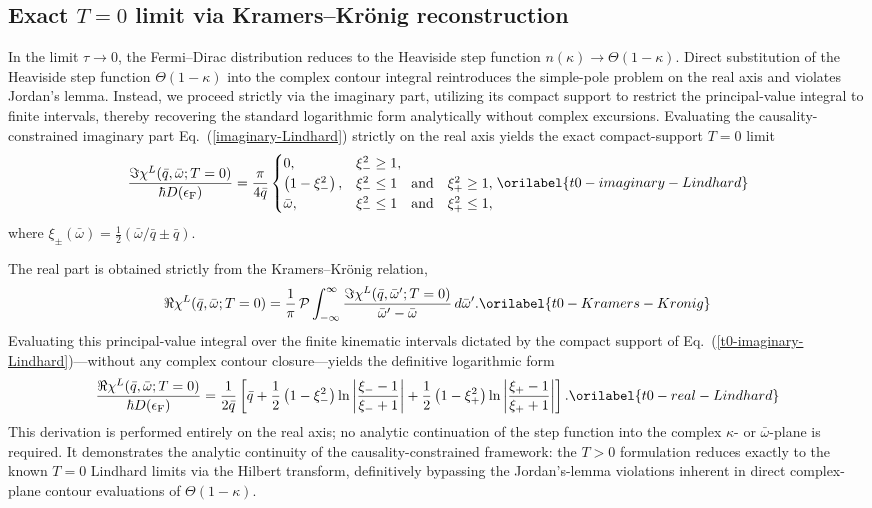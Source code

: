 \documentclass[aps,showkeys,noshowpacs,superscriptaddress,pre,preprint]{revtex4-2}
\let\label\orilabel
\begin{document}
\subsection{Exact $T=0$ limit via Kramers--Kr\"onig reconstruction}
\label{sec:t0-kk-reconstruction}

In the limit $\tau\to 0$, the Fermi--Dirac distribution reduces to the Heaviside step function $n(\kappa)\to\Theta(1-\kappa)$.
Direct substitution of the Heaviside step function $\Theta(1-\kappa)$ into the complex contour integral reintroduces the simple-pole problem on the real axis and violates Jordan's lemma.
Instead, we proceed strictly via the imaginary part, utilizing its compact support to restrict the principal-value integral to finite intervals, thereby recovering the standard logarithmic form analytically without complex excursions.
Evaluating the causality-constrained imaginary part Eq.~(\ref{imaginary-Lindhard}) strictly on the real axis yields the exact compact-support $T=0$ limit~\cite{Lindhard1954}
\begin{equation}
\frac{\Im \chi^L(\bar{q},\bar{\omega};T=0)}{\hbar D(\epsilon_\mathrm{F})} = \frac{\pi}{4\bar{q}}
\begin{cases}
0 , & \xi_-^2 \ge 1 , \\
\left( 1 - \xi_-^2 \right) , & \xi_-^2 \le 1 \quad \mathrm{and} \quad \xi_+^2 \ge 1 , \\
\bar{\omega} , & \xi_-^2 \le 1 \quad \mathrm{and} \quad \xi_+^2 \le 1 ,
\end{cases}
\label{t0-imaginary-Lindhard}
\end{equation}
where $\xi_\pm(\bar{\omega}) = \frac{1}{2}\left(\bar{\omega}/\bar{q} \pm \bar{q}\right)$.

The real part is obtained strictly from the Kramers--Kr\"onig relation,
\begin{equation}
\Re \chi^L(\bar{q},\bar{\omega};T=0) = \frac{1}{\pi}\,\mathcal{P}\int_{-\infty}^{\infty}\frac{\Im \chi^L(\bar{q},\bar{\omega}';T=0)}{\bar{\omega}'-\bar{\omega}}\,d\bar{\omega}' .
\label{t0-Kramers-Kronig}
\end{equation}
Evaluating this principal-value integral over the finite kinematic intervals dictated by the compact support of Eq.~(\ref{t0-imaginary-Lindhard})---without any complex contour closure---yields the definitive logarithmic form
\begin{equation}
\frac{\Re \chi^L(\bar{q},\bar{\omega};T=0)}{\hbar D(\epsilon_\mathrm{F})} = \frac{1}{2\bar{q}} \left[ \bar{q}
+ \frac{1}{2} \left( 1 - \xi_-^2 \right) \ln\left\vert \frac{\xi_- - 1}{\xi_- + 1} \right\vert
+ \frac{1}{2} \left( 1 - \xi_+^2 \right) \ln\left\vert \frac{\xi_+ - 1}{\xi_+ + 1} \right\vert
\right] .
\label{t0-real-Lindhard}
\end{equation}
This derivation is performed entirely on the real axis; no analytic continuation of the step function into the complex $\kappa$- or $\bar{\omega}$-plane is required.
It demonstrates the analytic continuity of the causality-constrained framework: the $T>0$ formulation reduces exactly to the known $T=0$ Lindhard limits via the Hilbert transform, definitively bypassing the Jordan's-lemma violations inherent in direct complex-plane contour evaluations of $\Theta(1-\kappa)$.
\end{document}
